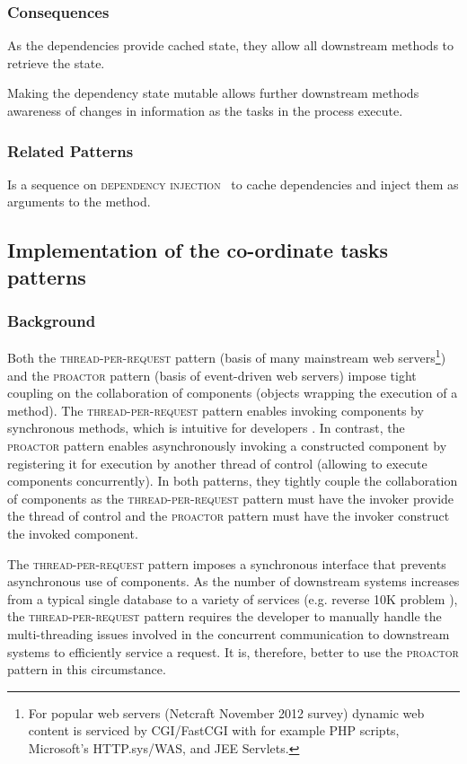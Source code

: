 \documentclass[prodmode]{style/acmlarge}
\begin{document}
\subsubsection*{Consequences}

As the dependencies provide cached state, they allow all downstream methods to
retrieve the state.

Making the dependency state mutable allows further downstream methods awareness
of changes in information as the tasks in the process execute.

\subsubsection*{Related Patterns}

Is a sequence on \textsc{dependency injection}~\cite{ioc} to cache dependencies
and inject them as arguments to the method.


\subsection{Implementation of the co-ordinate tasks patterns}

\subsubsection*{Background}

Both the \textsc{thread-per-request} pattern \cite{thread-per-request} (basis of
many mainstream web servers\footnote{For popular web servers (Netcraft November
2012 survey) dynamic web content is serviced by CGI/FastCGI with for example PHP
scripts, Microsoft's HTTP.sys/WAS, and JEE Servlets.}) and the \textsc{proactor}
pattern \cite{proactor} (basis of event-driven web servers) impose tight
coupling on the collaboration of components (objects wrapping the execution of a
method).  The \textsc{thread-per-request} pattern enables invoking components by
synchronous methods, which is intuitive for developers \cite[p. 2]{proactor}. 
In contrast, the \textsc{proactor} pattern enables asynchronously invoking a
constructed component by registering it for execution by another thread of
control (allowing to execute components concurrently).  In both patterns, they
tightly couple the collaboration of components as the
\textsc{thread-per-request} pattern must have the invoker provide the thread of
control and the \textsc{proactor} pattern must have the invoker construct the
invoked component.

The \textsc{thread-per-request} pattern imposes a synchronous interface that
prevents asynchronous use of components.  As the number of downstream systems
increases from a typical single database to a variety of services (e.g.
reverse 10K problem \cite{reverse-ten-k-problem}), the
\textsc{thread-per-request} pattern requires the developer to manually handle
the multi-threading issues involved in the concurrent communication to
downstream systems to efficiently service a request.  It is, therefore, better
to use the \textsc{proactor} pattern in this circumstance.
\end{document}
